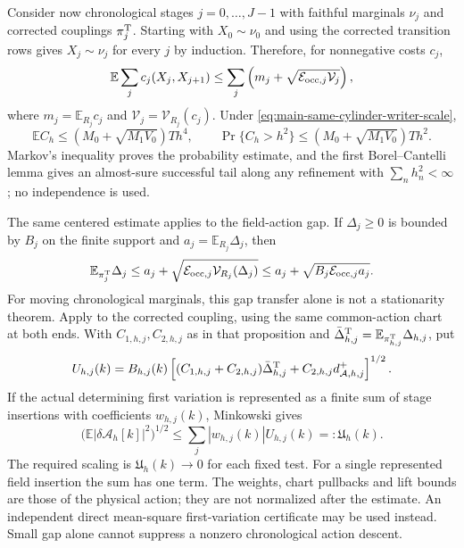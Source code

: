 \documentclass[11pt]{article}
\numberwithin{equation}{section}
\theoremstyle{definition}
\theoremstyle{remark}
\begin{document}
Consider now chronological stages $j=0,\ldots,J-1$ with faithful marginals
$\nu_j$ and corrected couplings $\pi_j^{\rm T}$.  Starting with
$X_0\sim\nu_0$ and using the corrected transition rows gives
$X_j\sim\nu_j$ for every $j$ by induction.  Therefore, for nonnegative costs
$c_j$,
\begin{equation}
 \mathbb E\sum_jc_j(X_j,X_{j+1})
 \le\sum_j\left(m_j+
 \sqrt{\mathcal E_{{\rm occ},j}\mathcal V_j}\right),
 \label{eq:supp-same-cylinder-chain-cost}
\end{equation}
where $m_j=\mathbb E_{R_j}c_j$ and
$\mathcal V_j=\mathcal V_{R_j}(c_j)$.  Under
\eqref{eq:main-same-cylinder-writer-scale},
\begin{equation}
 \mathbb EC_h\le(M_0+\sqrt{M_1V_0})Th^4,
 \qquad
 \Pr\{C_h>h^2\}\le(M_0+\sqrt{M_1V_0})Th^2.
 \label{eq:supp-same-cylinder-badprob}
\end{equation}
Markov's inequality proves the probability estimate, and the first
Borel--Cantelli lemma gives an almost-sure successful tail along any
refinement with $\sum_nh_n^2<\infty$; no independence is used.

The same centered estimate applies to the field-action gap.  If
$\Delta_j\ge0$ is bounded by $B_j$ on the finite support and
$a_j=\mathbb E_{R_j}\Delta_j$, then
\begin{equation}
 \mathbb E_{\pi_j^{\rm T}}\Delta_j
 \le a_j+\sqrt{\mathcal E_{{\rm occ},j}
                    \mathcal V_{R_j}(\Delta_j)}
 \le a_j+\sqrt{B_j\mathcal E_{{\rm occ},j}a_j}.
 \label{eq:supp-same-cylinder-action-gap}
\end{equation}
For moving chronological marginals, this gap transfer alone is not a
stationarity theorem. Apply  to the
corrected coupling, using the same common-action chart at both ends.
With $C_{1,h,j},C_{2,h,j}$ as in that proposition and
$\bar\Delta^{\rm T}_{h,j}=\mathbb E_{\pi^{\rm T}_{h,j}}\Delta_{h,j}$,
put
\begin{equation}
 U_{h,j}(k)=B_{h,j}(k)
 \left[(C_{1,h,j}+C_{2,h,j})\bar\Delta^{\rm T}_{h,j}
                      +C_{2,h,j}d^+_{\mathcal A,h,j}\right]^{1/2}.
 \label{eq:supp-same-cylinder-stage-test}
\end{equation}
If the actual determining first variation is represented as a finite sum
of stage insertions with coefficients $w_{h,j}(k)$, Minkowski gives
\begin{equation}
 \bigl(\mathbb E|\delta\mathcal A_h[k]|^2\bigr)^{1/2}
 \le\sum_j|w_{h,j}(k)|U_{h,j}(k)=:\mathfrak U_h(k).
 \label{eq:supp-same-cylinder-physical-scale}
\end{equation}
The required scaling is $\mathfrak U_h(k)\to0$ for each fixed test.
For a single represented field insertion the sum has one term.  The
weights, chart pullbacks and lift bounds are those of the physical action;
they are not normalized after the estimate.  An independent direct
mean-square first-variation certificate may be used instead.  Small gap
alone cannot suppress a nonzero chronological action descent.
\end{document}
